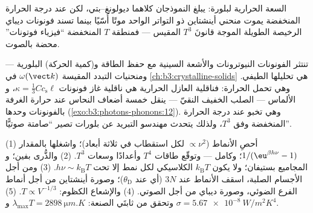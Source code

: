 \begin{omfigure}

{\small السعة الحرارية لبلورة: يبلغ النموذجان كلاهما
ديولونغ--بتي، لكن عند درجة الحرارة المنخفضة يموت منحني أينشتاين
ذو التواتر الواحد موتًا أُسّيًا بينما تسند فونونات ديباي
الرخيصة الطويلة الموجة قانونَ $T^3$ المقيس --- فمنطقة $T$ المنخفضة
``فيزياء فوتونات'' محضة بالصوت.}
\end{omfigure}

\begin{example}\label{ex:b3:photons-phonons:phonon-real}
تنتثر الفونونات النيوترونات والأشعة السينية مع حفظ الطاقة و(كمية
الحركة) البلورية --- ومنحنيات التبدد المقيسة
$\omega(\vect k)$ في \cref{ch:b3:crystalline-solids} هي
تحليلها الطيفي. وهي تحمل الحرارة: فناقلية العازل الحرارية
هي ناقلية غاز فونونات $\kappa = \tfrac13 Cc_{\text{s}}\ell$، و
الألماس --- الصلب الخفيف النقيّ --- ينقل خمسة أضعاف النحاس عند
حرارة الغرفة بالفونونات وحدها
(\cref{exo:b3:photons-phonons:12}). وهي تخبو عند درجة الحرارة
المنخفضة وفق $T^3$، ولذلك يتحدث مهندسو التبريد عن
بلورات تصير ``صامتة صوتيًّا''.
\end{example}

\begin{method}\label{met:b3:photons-phonons:method}
(1) أحصِ الأنماط ($\propto\nu^2$ لكل استقطاب في ثلاثة أبعاد)؛ واشغلها
بالمقدار $1/(\eu^{\beta h\nu} - 1)$؛ وكامل --- وتوقّع طاقات $T^4$
وأعدادًا وسعات $T^3$. (2) والذُّرى بفين؛ و
المجاميع بستيفان؛ ولا يكون $k_{\text{B}}T$ الكلاسيكي لكل نمط إلا تحت
$h\nu \sim k_{\text{B}}T$. (3) ومن أجل الأجسام الصلبة، اسقف الأنماط عند $3N$
(أي عند $\theta_{\text{D}}$)؛ وصورة أينشتاين من أجل أنماط الفرع الضوئي،
وصورة ديباي من أجل الصوتي. (4) والإشعاع الكظوم: $T \propto
V^{-1/3}$. (5) وتحقق من ثابتَي الصنعة: $\lambda_{
\max}T = \qty{2898}{\micro m.K}$ و $\sigma =
\qty{5.67e-8}{W/m^2K^4}$.
\end{method}

